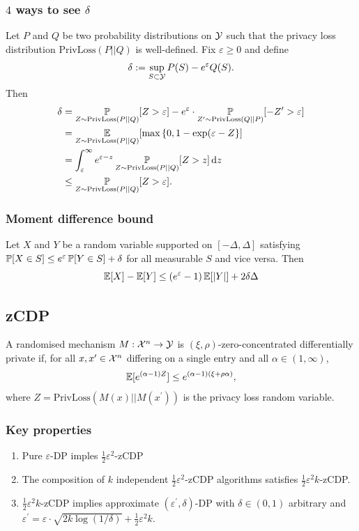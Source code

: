 \documentclass[10pt]{article}
\begin{document}
\subsubsection[alternative]{$4$ ways to see $\delta$}
 Let $P$ and $Q$ be two probability distributions on $\mathcal{Y}$ such that the privacy loss distribution $\text{PrivLoss}(P||Q)$ is well-defined. Fix $\varepsilon \geq 0$ and define 
\begin{equation}
    \delta := \sup_{S \subset \mathcal{Y}} P(S) - e^{\varepsilon} Q(S).
\end{equation}
Then 
\begin{align*}
    \delta &= \mathop{\mathbb{P} \displaystyle}_{Z \sim \text{PrivLoss}(P||Q)}[Z > \varepsilon] - e^{\varepsilon} \cdot \mathop{\mathbb{P} \displaystyle}_{Z^{\prime} \sim \text{PrivLoss}(Q||P)}[-Z^{\prime} > \varepsilon] \\
    &= \mathop{\mathbb{E} \displaystyle}_{Z \sim \text{PrivLoss}(P||Q)}[\max \left\{ 0, 1- \exp(\varepsilon - Z \right\}] \\ 
    &= \int_{\varepsilon}^{\infty} e^{\varepsilon-z} \mathop{\mathbb{P} \displaystyle}_{Z \sim \text{PrivLoss}(P ||Q)}[Z > z] \,\mathrm{d}z \\ 
    &\leq \mathop{\mathbb{P} \displaystyle}_{Z \sim \text{PrivLoss}(P||Q)}[Z > \varepsilon]. 
\end{align*}
\subsubsection{Moment difference bound}
Let $X$ and $Y$ be a random variable supported on $[- \Delta, \Delta]$ satisfying $\mathop{\mathbb{P} \displaystyle} [ X \in S] \leq e^{\varepsilon} \mathop{\mathbb{P} \displaystyle} [Y \in S] + \delta$ for all measurable $S$ and vice versa. Then 
\begin{equation}
    \mathop{\mathbb{E} \displaystyle}[X] - \mathop{\mathbb{E} \displaystyle}[Y] \leq (e^{\varepsilon} - 1) \mathop{\mathbb{E} \displaystyle} [|Y|] + 2 \delta \Delta 
\end{equation}
\subsection{zCDP}
 A randomised mechanism $M: \mathcal{X}^n \to \mathcal{Y}$ is $(\xi, \rho)$-zero-concentrated differentially private if, for all $x, x^{\prime} \in \mathcal{X}^n$ differing on a single entry and all $\alpha \in (1, \infty)$, 
\begin{equation}
    \mathop{\mathbb{E} \displaystyle} [ e^{ (\alpha-1) Z}] \leq e^{(\alpha-1)(\xi + \rho \alpha)}, 
\end{equation}
where $Z = \text{PrivLoss} (M(x) || M(x^{\prime}))$ is the privacy loss random variable.
\subsubsection{Key properties}
\begin{enumerate}
    \item Pure $\varepsilon$-DP imples $\frac{1}{2}\varepsilon^2$-zCDP 
    \item The composition of $k$ independent $\frac{1}{2}\varepsilon^2$-zCDP algorithms satisfies $\frac{1}{2}\varepsilon^2k$-zCDP. 
    \item $\frac{1}{2}\varepsilon^2k$-zCDP implies approximate $(\varepsilon^{\prime}, \delta)$-DP with $\delta \in (0,1)$ arbitrary  and $\varepsilon^{\prime} = \varepsilon \cdot \sqrt{2 k \log (1/ \delta)} + \frac{1}{2} \varepsilon^2 k$. 
\end{enumerate}
\end{document}
